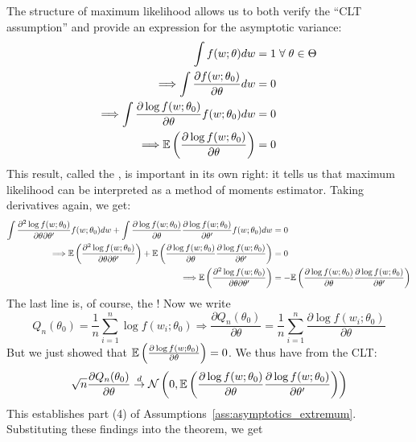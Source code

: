 \documentclass[10pt]{article}
\begin{document}
\begin{remark}
	The structure of maximum likelihood allows us to both verify the ``CLT assumption'' and provide an expression for the asymptotic variance:
	\begin{align*}
		\int f(w;\theta)dw &= 1 \forall \theta \in \Theta \\
		\Longrightarrow \int \frac{\partial f(w;\theta_0)}{\partial \theta}dw &= 0 \\
		\Longrightarrow \int  \frac{\partial \log f(w;\theta_0)}{\partial \theta} f(w;\theta_0)dw &= 0 \\
		\Longrightarrow \expect \parl \frac{\partial \log f(w;\theta_0)}{\partial \theta}\parr &= 0
	\end{align*}
	This result, called the , is important in its own right: it tells us that maximum likelihood can be interpreted as a method of moments estimator. Taking derivatives again, we get:
	\begin{align*}
		\int \frac{\partial^2 \log f(w;\theta_0)}{\partial \theta \partial \theta'}f(w;\theta_0)dw + \int \frac{\partial \log f(w;\theta_0)}{\partial \theta}\frac{\partial \log f(w;\theta_0)}{\partial \theta'} f(w;\theta_0) dw &= 0 \\
		\Longrightarrow \mathbb{E} \left( \frac{\partial^2 \log f(w;\theta_0)}{\partial \theta \partial \theta'}\right) + \mathbb{E} \left( \frac{\partial \log f(w;\theta_0)}{\partial \theta}\frac{\partial \log f(w;\theta_0)}{\partial \theta'}\right) &= 0 \\
		\Longrightarrow  \mathbb{E} \left( \frac{\partial^2 \log f(w;\theta_0)}{\partial \theta \partial \theta'}\right) &= - \mathbb{E} \left( \frac{\partial \log f(w;\theta_0)}{\partial \theta}\frac{\partial \log f(w;\theta_0)}{\partial \theta'}\right)
	\end{align*}
	The last line is, of course, the ! Now we write
	\[Q_n(\theta_0) = \frac{1}{n} \sum_{i=1}^n \log f(w_i;\theta_0) \Longrightarrow \frac{\partial Q_n(\theta_0)}{\partial \theta} = \frac{1}{n} \sum_{i=1}^n \frac{\partial \log f(w_i;\theta_0)}{\partial \theta}\]But we just showed that $\mathbb{E} \left( \frac{\partial \log f(w;\theta_0)}{\partial \theta}\right) = 0$. We thus have from the CLT:
	\[
	\sqrt{n} \frac{\partial Q_n(\theta_0)}{\partial \theta} \overset{d}{\to} \mathcal{N} \left( 0, \mathbb{E} \left( \frac{\partial \log f(w;\theta_0)}{\partial \theta}\frac{\partial \log f(w;\theta_0)}{\partial \theta'}\right)\right)
	\]
	This establishes part (4) of Assumptions~\ref{ass:asymptotics_extremum}. Substituting these findings into the theorem, we get 

\end{remark}
\end{document}
